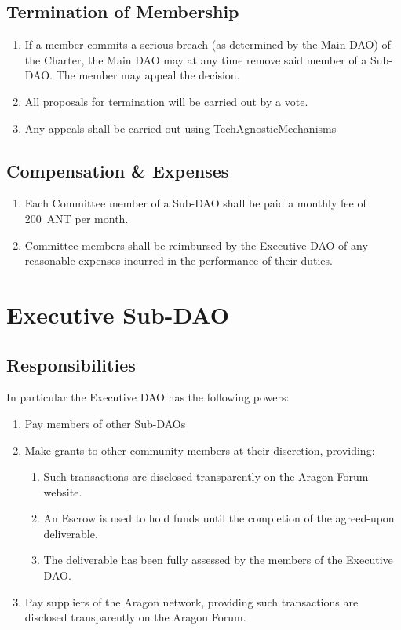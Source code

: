 \subsection{Termination of Membership}

\begin{enumerate}
	\item If a member commits a serious breach (as determined by the Main \ac{DAO}) of the Charter, the Main \ac{DAO} may at any time remove said member of a Sub-\ac{DAO}.
	The member may appeal the decision.
	\item All proposals for termination will be carried out by a vote.
	\item Any appeals shall be carried out using \gls{TechAgnosticMechanisms}
\end{enumerate}


\subsection{Compensation \& Expenses}

\begin{enumerate}
	\item Each Committee member of a Sub-\ac{DAO} shall be paid a monthly fee of 200~\ac{ANT} per month.
	\item Committee members shall be reimbursed by the Executive \ac{DAO} of any reasonable expenses incurred in the performance of their duties.
\end{enumerate}


\section{Executive Sub-DAO}

\subsection{Responsibilities}

In particular the Executive \ac{DAO} has the following powers:
\begin{enumerate}
	\item Pay members of other Sub-\acp{DAO}
	\item Make grants to other community members at their discretion, providing:
	\begin{enumerate}
		\item Such transactions are disclosed transparently on the Aragon Forum website.
		\item An Escrow is used to hold funds until the completion of the agreed-upon deliverable.
		\item The deliverable has been fully assessed by the members of the Executive \ac{DAO}.
	\end{enumerate}
	\item Pay suppliers of the Aragon network, providing such transactions are disclosed transparently on the Aragon Forum.
\end{enumerate}

